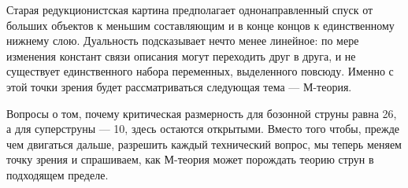 Старая редукционистская картина предполагает однонаправленный спуск от больших объектов к меньшим составляющим и в конце концов к единственному нижнему слою. Дуальность подсказывает нечто менее линейное: по мере изменения констант связи описания могут переходить друг в друга, и не существует единственного набора переменных, выделенного повсюду. Именно с этой точки зрения будет рассматриваться следующая тема — М-теория.

Вопросы о том, почему критическая размерность для бозонной струны равна 26, а для суперструны — 10, здесь остаются открытыми. Вместо того чтобы, прежде чем двигаться дальше, разрешить каждый технический вопрос, мы теперь меняем точку зрения и спрашиваем, как М-теория может порождать теорию струн в подходящем пределе.